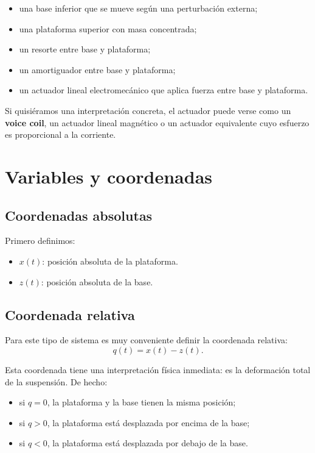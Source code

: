 \documentclass[11pt]{article}
\begin{document}
\begin{itemize}[leftmargin=1.2cm]
\item una base inferior que se mueve seg\'un una perturbaci\'on externa;
\item una plataforma superior con masa concentrada;
\item un resorte entre base y plataforma;
\item un amortiguador entre base y plataforma;
\item un actuador lineal electromec\'anico que aplica fuerza entre base y plataforma.
\end{itemize}

Si quisi\'eramos una interpretaci\'on concreta, el actuador puede verse como un \textbf{voice coil}, un actuador lineal magn\'etico o un actuador equivalente cuyo esfuerzo es proporcional a la corriente.

\section{Variables y coordenadas}

\subsection{Coordenadas absolutas}

Primero definimos:

\begin{itemize}[leftmargin=1.2cm]
\item $x(t)$: posici\'on absoluta de la plataforma.
\item $z(t)$: posici\'on absoluta de la base.
\end{itemize}

\subsection{Coordenada relativa}

Para este tipo de sistema es muy conveniente definir la coordenada relativa:
\begin{equation}
q(t) = x(t) - z(t).
\label{eq:qdef}
\end{equation}

Esta coordenada tiene una interpretaci\'on f\'isica inmediata: es la deformaci\'on total de la suspensi\'on. De hecho:

\begin{itemize}[leftmargin=1.2cm]
\item si $q=0$, la plataforma y la base tienen la misma posici\'on;
\item si $q>0$, la plataforma est\'a desplazada por encima de la base;
\item si $q<0$, la plataforma est\'a desplazada por debajo de la base.
\end{itemize}
\end{document}
